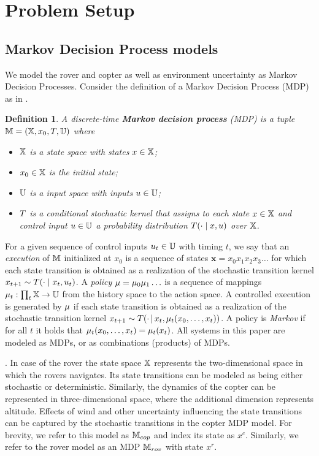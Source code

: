 \documentclass[conference]{IEEEtran}
\renewcommand{\cite}[1]{\citep{#1}}
\newtheorem{definition}{Definition}
\begin{document}
\section{Problem Setup}
\label{sec:problem}

\subsection{Markov Decision Process models}
We model the rover and copter as well as environment uncertainty as Markov Decision Processes. Consider the definition of a Markov Decision Process (MDP) as in \cite{Bertsekas1978}.
\begin{definition}
\label{def:MDP}
  A discrete-time \textbf{Markov decision process} (MDP) is a tuple $\mathbb{M} = (\mathbb{X}, x_0,T, \mathbb{U})$ where
  \begin{itemize}
    \item $\mathbb{X}$ is a state space with states $x\in\mathbb{X}$; %
    \item $x_0\in \mathbb{X}$ is the initial state;
    \item $\mathbb{U}$ is a input space with inputs $u\in\mathbb{U}$;
    \item $T$ is a conditional stochastic kernel that assigns to each state $x\in \mathbb{X}$ and control input $u\in \mathbb{U}$ a probability distribution $T(\cdot\mid x,u)$ over $\mathbb{X}$.
  \end{itemize}
\end{definition}
For a given sequence of control inputs $u_t \in \mathbb{U}$ with timing $t$, we say that an \emph{execution} of $\mathbb{M}$ initialized at $x_0$ is a sequence of states $\mathbf x = x_0x_1x_2x_3\ldots $ for which each state transition is obtained as a realization of the stochastic transition kernel $x_{t+1} \sim T(\cdot \mid x_t, u_t)$. A \emph{policy} $\mu = \mu_0 \mu_1 \ldots$ is a sequence of mappings $\mu_t:\prod_{t}\mathbb{X}\rightarrow \mathbb{U}$ from the history space to the action space. A controlled execution is generated by $\mu$ if each state transition is obtained as a realization of the stochastic transition kernel $x_{t+1} \sim T(\cdot\,{ \mid}\, x_t, \mu_t(x_0,\ldots,x_t))$.  A policy is \emph{Markov}  if for all $t$ it holds that  $\mu_t(x_0, \ldots, x_t) = \mu_t(x_t)$. All systems in this paper are modeled as MDPs, or as combinations (products) of MDPs.

\smallskip
{}.
In case of the rover the state space $\mathbb{X}$ represents the two-dimensional space in which the rovers navigates. Its state transitions can be modeled as being either stochastic or deterministic. Similarly, the dynamics of the copter can be represented in three-dimensional space, where the additional dimension represents altitude. Effects of wind and other uncertainty influencing the state transitions can be captured by the stochastic transitions in the copter MDP model. For brevity, we refer to this model as $\mathbb{M}_{cop}$ and index its state as $x^c$. Similarly, we refer to the rover model as an MDP $\mathbb{M}_{rov}$ with state $x^r$.
\end{document}
